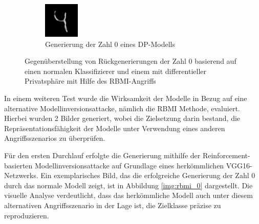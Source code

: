 \begin{figure}[H]
\begin{subfigure}[b]{0.35\linewidth}
		\includegraphics[width=\linewidth]{Bilder/0_rbmi_dp.png}
		\caption{Generierung der Zahl 0 eines DP-Modells}
		\label{img:rbmi_0_dp}
	\end{subfigure}
	\caption{Gegenüberstellung von Rückgenerierungen der Zahl 0 basierend auf einen normalen Klassifizierer und einem mit differentieller Privatsphäre mit Hilfe des \glqq RBMI\grqq-Angriffs}
	\label{img:rbmi_dpvsnorm}
\end{figure}

In einem weiteren Test wurde die Wirksamkeit der Modelle in Bezug auf eine alternative Modellinversionsattacke, nämlich die RBMI Methode, evaluiert. Hierbei wurden 2 Bilder generiert, wobei die Zielsetzung darin bestand, die Repräsentationsfähigkeit der Modelle unter Verwendung eines anderen Angriffsszenarios zu überprüfen.

Für den ersten Durchlauf erfolgte die Generierung mithilfe der Reinforcement-basierten Modellinversionsattacke auf Grundlage eines herkömmlichen VGG16-Netzwerks. Ein exemplarisches Bild, das die erfolgreiche Generierung der Zahl 0 durch das normale Modell zeigt, ist in Abbildung \ref{img:rbmi_0} dargestellt. Die visuelle Analyse verdeutlicht, dass das herkömmliche Modell auch unter diesem alternativen Angriffsszenario in der Lage ist, die Zielklasse präzise zu reproduzieren.

